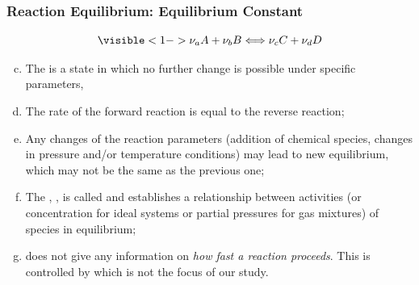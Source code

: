 \documentclass[10pt,compress,unknownkeysallowed]{beamer}
\begin{document}
\begin{frame}
  \frametitle{Reaction Equilibrium: Equilibrium Constant}
        \begin{displaymath}
           \visible<1->{\nu_{a}A + \nu_{b}B  \Longleftrightarrow \nu_{c}C + \nu_{d}D } 
        \end{displaymath}
      \begin{enumerate}[a)]\setcounter{enumi}{2}
         \item<1-> The  is a state in which no further change is possible under specific parameters, \ie 
         \item<1-> The rate of the forward reaction is equal to the reverse reaction;
         \item<2-> Any changes of the reaction parameters (\eg addition of chemical species, changes in pressure and/or temperature conditions) may lead to new equilibrium, which may not be the same as the previous one;
         \item<3-> The , , is called  and establishes a relationship between activities (or concentration for ideal systems or partial pressures for gas mixtures) of species in equilibrium;
         \item<3->  does not give any information on {\it how fast a reaction proceeds}. This is controlled by  which is not the focus of our study.
      \end{enumerate}
\end{frame}
\end{document}

